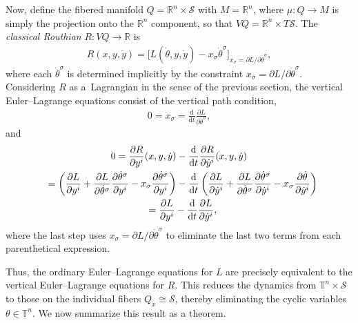 \documentclass[pdftex]{sigma}
\numberwithin{equation}{section}
\begin{document}
Now, def\/ine the f\/ibered manifold $ Q = \mathbb{R}^n \times \mathcal{S} $ with $ M = \mathbb{R}^n $, where $ \mu \colon Q \rightarrow M $ is simply the projection onto the $\mathbb{R}^n$ component, so that $ V Q = \mathbb{R}^n \times T \mathcal{S} $. The \emph{classical Routhian} $ R \colon V Q \rightarrow \mathbb{R} $ is
\begin{gather} \label{eqn:classicalRouthian}
 R ( x, y , \dot{y} ) = \bigl[ L ( \dot{\theta} , y, \dot{y} ) - x _\sigma \dot{\theta} ^\sigma \bigr] _{ x _\sigma = \partial L / \partial \dot{\theta} ^\sigma } ,
\end{gather}
where each $ \dot{\theta} ^\sigma $ is determined implicitly by the constraint $ x _\sigma = \partial L / \partial \dot{\theta} ^\sigma $. Considering $R$ as a~Lagrangian in the sense of the previous section, the vertical Euler--Lagrange equations consist of the vertical path condition,
\begin{gather*}
 0 = \dot{x} _\sigma = \frac{\mathrm{d}}{\mathrm{d}t} \frac{ \partial L }{ \partial \dot{\theta} ^\sigma },
\end{gather*}
and
\begin{gather*}
 0 = \frac{ \partial R }{ \partial y ^i } ( x, y , \dot{y} ) - \frac{\mathrm{d}}{\mathrm{d}t} \frac{ \partial R }{ \partial
 \dot{y} ^i } ( x, y , \dot{y} ) \\
\hphantom{0}{}
= \left( \frac{ \partial L }{ \partial y ^i } + \frac{ \partial L }{ \partial \dot{\theta} ^\sigma } \frac{ \partial
 \dot{\theta} ^\sigma }{ \partial y ^i } - x _\sigma
 \frac{ \partial \dot{\theta} ^\sigma }{ \partial y ^i } \right) -\frac{\mathrm{d}}{\mathrm{d}t} \left( \frac{ \partial L
 }{ \partial \dot{y} ^i } + \frac{ \partial L }{ \partial \dot{\theta} ^\sigma } \frac{ \partial \dot{\theta} ^\sigma }{ \partial \dot{y} ^i } -
 x _\sigma \frac{ \partial \dot{\theta} }{ \partial \dot{y} ^i } \right) \\
\hphantom{0}{} = \frac{ \partial L }{ \partial y ^i } - \frac{\mathrm{d}}{\mathrm{d}t} \frac{ \partial L
 }{ \partial \dot{y} ^i },
\end{gather*}
where the last step uses $ x _\sigma = \partial L / \partial \dot{\theta} ^\sigma $ to eliminate the last two terms from each parenthetical expression.

Thus, the ordinary Euler--Lagrange equations for $L$ are precisely equivalent to the vertical Euler--Lagrange equations for $R$. This reduces the dynamics from $\mathbb{T} ^n \times \mathcal{S} $ to those on the individual f\/ibers $ Q _x \cong \mathcal{S} $, thereby eliminating the cyclic variables $\theta \in \mathbb{T} ^n $. We now summarize this result as a theorem.
\end{document}
